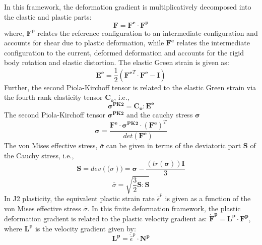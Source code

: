 In this framework, the deformation gradient is multiplicatively decomposed into the elastic and plastic parts: 
\begin{equation}
\boldsymbol{F} = \boldsymbol{F^e} \cdot \boldsymbol{F^p}
\end{equation}
where, $\boldsymbol{F^p}$ relates the reference configuration to an intermediate configuration and accounts for shear due to plastic deformation, while $\boldsymbol{F^e}$ relates the intermediate configuration to the current, deformed deformation and accounts for the rigid body rotation and elastic distortion. 
The elastic Green strain is given as:
\begin{equation}
\boldsymbol{E^e} = \frac{1}{2} (\boldsymbol{F^e}^T \cdot \boldsymbol{F^e} - \boldsymbol{I})
\end{equation}
Further, the second Piola-Kirchoff tensor is related to the elastic Green strain via the fourth rank elasticity tensor $\boldsymbol{C_o}$, i.e.,
\begin{equation}
    \boldsymbol{\sigma^{PK2}} = \boldsymbol{C_o} : \boldsymbol{E^e}
\end{equation}
The second Piola-Kirchoff tensor $\boldsymbol{\sigma^{PK2}}$ and the cauchy stress $\boldsymbol{\sigma}$
\begin{equation}
    \boldsymbol{\sigma} = \frac{\boldsymbol{F^e} \cdot \boldsymbol{\sigma^{PK2}} \cdot \left (\boldsymbol{F^e}\right)^T}{det\left (\boldsymbol{F^e}\right)}
\end{equation}
The von Mises effective stress, $\bar{\sigma}$ can be given in terms of the deviatoric part $\boldsymbol{S}$ of the Cauchy stress, i.e.,
\begin{equation}
    \boldsymbol{S} = dev(\boldsymbol(\sigma)) = \boldsymbol{\sigma} - \frac{\left (tr(\boldsymbol{\sigma}) \right )\boldsymbol{I}}{3}
\end{equation}
\begin{equation}
    \bar{\sigma} = \sqrt{\frac{3}{2}\boldsymbol{S}:\boldsymbol{S}}
\end{equation}
In J2 plasticity, the equivalent plastic strain rate $\dot{\bar{\epsilon}}^p$ is given as a function of the von Mises effective stress $\bar{\sigma}$. In this finite deformation framework, the plastic deformation gradient is related to the plastic velocity gradient as: $\boldsymbol{\dot{F}^p} = \boldsymbol{L^p} \cdot \boldsymbol{F^p}$, where $\boldsymbol{L^p}$ is the velocity gradient given by:
\begin{equation}
    \boldsymbol{L^p} = \dot{\bar{\epsilon}}^p \cdot \boldsymbol{N^p}
\end{equation}
